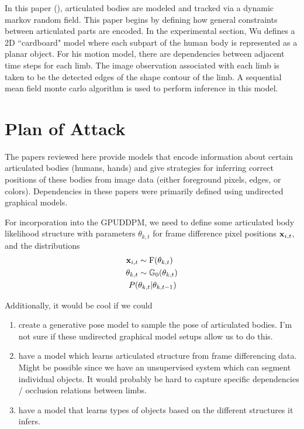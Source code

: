 \documentclass{article}
\begin{document}
In this paper (\cite{wu2003tracking}), articulated bodies are modeled and tracked via a dynamic markov random field. This paper begins by defining how general constraints between articulated parts are encoded. In the experimental section, Wu defines a 2D ``cardboard" model where each subpart of the human body is represented as a planar object. For his motion model, there are dependencies between adjacent time steps for each limb. The image observation associated with each limb is taken to be the detected edges of the shape contour of the limb. A sequential mean field monte carlo algorithm is used to perform inference in this model.




\section{Plan of Attack}

The papers reviewed here provide models that encode information about certain articulated bodies (humans, hands) and give strategies for inferring correct positions of these bodies from image data (either foreground pixels, edges, or colors). Dependencies in these papers were primarily defined using undirected graphical models.

For incorporation into the GPUDDPM, we need to define some articulated body likelihood structure with parameters $\theta_{k,t}$ for frame difference pixel positions $\bold{x}_{i,t}$, and the distributions
\begin{equation}
\begin{split}
\bold{x}_{i,t} &\sim \text{F}(\theta_{k,t}) \\
\theta_{k,t} &\sim \mathbb{G}_{0}(\theta_{k,t}) \\
P(&\theta_{k,t} | \theta_{k,t-1})
\end{split}
\end{equation}

Additionally, it would be cool if we could
\begin{enumerate}
\item create a generative pose model to sample the pose of articulated bodies. I'm not sure if these undirected graphical model setups allow us to do this.
\item have a model which learns articulated structure from frame differencing data. Might be possible since we have an unsupervised system which can segment individual objects. It would probably be hard to capture specific dependencies / occlusion relations between limbs.
\item have a model that learns types of objects based on the different structures it infers.
\end{enumerate}



\begin{small}

 
\end{small}
\end{document}
